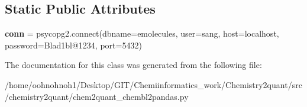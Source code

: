 \subsection*{Static Public Attributes}
\begin{DoxyCompactItemize}
\item 
\mbox{\label{classchemistry2quant_1_1chem2quant__chembl2pandas_1_1chemblConnect_aa102734757bfb1cee082f73e815ae6bd}} 
{\bfseries conn} = psycopg2.\+connect(dbname=\textquotesingle{}emolecules\textquotesingle{}, user=\textquotesingle{}sang\textquotesingle{}, host=\textquotesingle{}localhost\textquotesingle{}, password=\textquotesingle{}Blad1bl@1234\textquotesingle{}, port=5432)
\end{DoxyCompactItemize}


The documentation for this class was generated from the following file\+:\begin{DoxyCompactItemize}
\item 
/home/oohnohnoh1/\+Desktop/\+G\+I\+T/\+Chemiinformatics\+\_\+work/\+Chemistry2quant/src/chemistry2quant/chem2quant\+\_\+chembl2pandas.\+py\end{DoxyCompactItemize}
